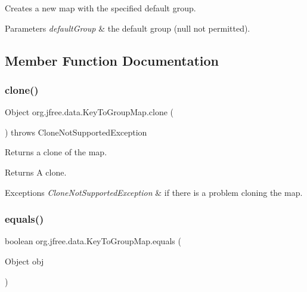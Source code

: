 Creates a new map with the specified default group.


\begin{DoxyParams}{Parameters}
{\em default\+Group} & the default group ({\ttfamily null} not permitted). \\
\hline
\end{DoxyParams}


\subsection{Member Function Documentation}
\mbox{\label{classorg_1_1jfree_1_1data_1_1_key_to_group_map_a2c5cdd3650a85cfd2b467a930f859f46}} 
\subsubsection{\texorpdfstring{clone()}{clone()}}
{\footnotesize\ttfamily Object org.\+jfree.\+data.\+Key\+To\+Group\+Map.\+clone (\begin{DoxyParamCaption}{ }\end{DoxyParamCaption}) throws Clone\+Not\+Supported\+Exception}

Returns a clone of the map.

\begin{DoxyReturn}{Returns}
A clone.
\end{DoxyReturn}

\begin{DoxyExceptions}{Exceptions}
{\em Clone\+Not\+Supported\+Exception} & if there is a problem cloning the map. \\
\hline
\end{DoxyExceptions}
\mbox{\label{classorg_1_1jfree_1_1data_1_1_key_to_group_map_a1f8872d18a0f85f2c9ff8bcca507d359}} 
\subsubsection{\texorpdfstring{equals()}{equals()}}
{\footnotesize\ttfamily boolean org.\+jfree.\+data.\+Key\+To\+Group\+Map.\+equals (\begin{DoxyParamCaption}\item[{Object}]{obj }\end{DoxyParamCaption})}

